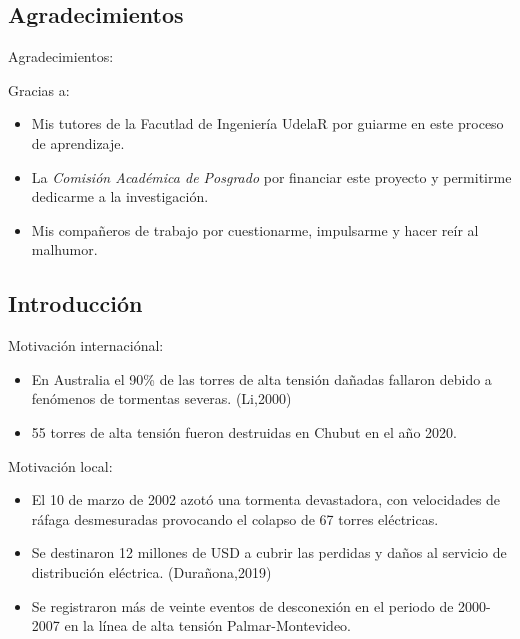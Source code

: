 \documentclass[
  aspectratio=169,
]{beamer}
\begin{document}
\begin{small}
\subsection[Agradecimientos]{Agradecimientos}
\begin{frame}{Agradecimientos:}{}
	\begin{block}{Gracias a:}
	\begin{itemize}
		\item Mis tutores de la Facutlad de Ingeniería UdelaR por guiarme en este proceso de aprendizaje.
		\pause
		\item La \emph{Comisión Académica de Posgrado} por financiar este proyecto y permitirme dedicarme a la investigación.
		\pause
		\item Mis compañeros de trabajo por cuestionarme, impulsarme y hacer reír al malhumor.  
	\end{itemize}
	\end{block}
\end{frame}
\subsection[Introducción]{Introducción}
\begin{frame}
	\begin{block}{Motivación internaciónal:}
		\begin{itemize}
			\item En Australia el 90\% de las torres de alta tensión dañadas fallaron debido a fenómenos de tormentas severas.  {\color{blue}(Li,2000)}
			\pause
			\item 55 torres de alta tensión fueron \alert{destruidas} en Chubut en el año 2020.
			\pause
		\end{itemize}
	\end{block}
	\vfill
	\begin{block}{Motivación local:}
		\begin{itemize}
			\item El 10 de marzo de 2002 azotó una tormenta devastadora, con velocidades de ráfaga desmesuradas provocando el \alert{colapso} de 67 torres eléctricas.
			\pause
			\item Se destinaron \alert{12 millones de USD} a cubrir las perdidas y daños al servicio de distribución eléctrica. {\color{blue}(Durañona,2019)}
			\pause
			\item Se registraron más de veinte eventos de desconexión en el periodo de 2000-2007 en la línea de alta tensión Palmar-Montevideo.
		\end{itemize}
	\end{block}
\end{frame}


\end{small}
\end{document}
